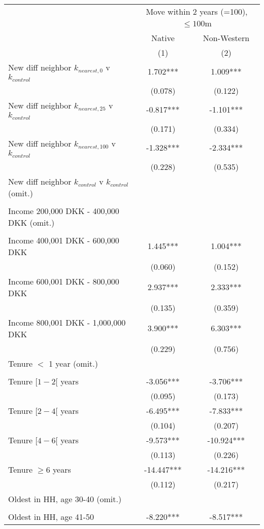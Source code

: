 \begin{tabular}{lcc}
\toprule
 & \multicolumn{2}{c}{Move within 2 years (=100), $\leq 100$m} \\ 
\cmidrule(lr){2-3}
 & Native & Non-Western \\ 
\cmidrule(lr){2-2} \cmidrule(lr){3-3}
  & (1) & (2) \\ 
\midrule
New diff neighbor $k_{nearest,0}$ v $k_{control}$ & 1.702*** & 1.009*** \\ 
 & (0.078) & (0.122) \\ 
New diff neighbor $k_{nearest,25}$ v $k_{control}$ & -0.817*** & -1.101*** \\ 
 & (0.171) & (0.334) \\ 
New diff neighbor $k_{nearest,100}$ v $k_{control}$ & -1.328*** & -2.334*** \\ 
 & (0.228) & (0.535) \\ 
 New diff neighbor $k_{control}$ v $k_{control}$ (omit.) &  &  \\ 
 &  &  \\ 
 Income 200,000 DKK - 400,000 DKK (omit.) &  &  \\ 
 &  &  \\ 
 Income 400,001 DKK - 600,000 DKK & 1.445*** & 1.004*** \\ 
 & (0.060) & (0.152) \\ 
Income 600,001 DKK - 800,000 DKK & 2.937*** & 2.333*** \\ 
 & (0.135) & (0.359) \\ 
Income 800,001 DKK - 1,000,000 DKK & 3.900*** & 6.303*** \\ 
 & (0.229) & (0.756) \\ 
 Tenure $<$ 1 year (omit.) &  &  \\ 
 &  &  \\ 
Tenure $[1-2[$ years & -3.056*** & -3.706*** \\ 
 & (0.095) & (0.173) \\ 
Tenure $[2-4[$ years & -6.495*** & -7.833*** \\ 
 & (0.104) & (0.207) \\ 
Tenure $[4-6[$ years & -9.573*** & -10.924*** \\ 
 & (0.113) & (0.226) \\ 
Tenure $\geq 6$ years & -14.447*** & -14.216*** \\ 
 & (0.112) & (0.217) \\ 
 Oldest in HH, age 30-40 (omit.) &  &  \\ 
 &  &  \\ 
Oldest in HH, age 41-50 & -8.220*** & -8.517*** \\ 

\end{tabular}
